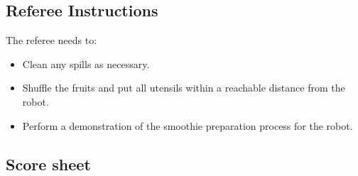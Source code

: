\subsection*{Referee Instructions}

The referee needs to:
\begin{itemize}
	\item Clean any spills as necessary.
	\item Shuffle the fruits and put all utensils within a reachable distance from the robot.
	\item Perform a demonstration of the smoothie preparation process for the robot.
\end{itemize}

\subsection*{Score sheet}

